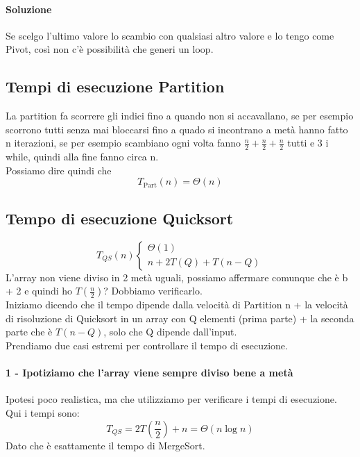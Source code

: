 \paragraph*{Soluzione} Se scelgo l'ultimo valore lo scambio con qualsiasi altro valore e lo tengo come Pivot, 
così non c'è possibilità che generi un loop.
\subsection{Tempi di esecuzione Partition}
La partition fa scorrere gli indici fino a quando non si accavallano, se per
esempio scorrono tutti senza mai bloccarsi fino a quado si incontrano a metà hanno fatto n iterazioni, se
per esempio scambiano ogni volta fanno $\frac{n}{2}+\frac{n}{2}+\frac{n}{2}$ tutti e 3 i while, quindi
alla fine fanno circa n.\\
Possiamo dire quindi che
\begin{equation*}
    T_{\text{Part}}(n)=\Theta(n)
\end{equation*}
\subsection{Tempo di esecuzione Quicksort}
\begin{equation*}
    T_{QS}(n)
    \begin{cases}
        \Theta(1)\\
        n+2T(Q)+T(n-Q)
    \end{cases}
\end{equation*}
L'array non viene diviso in 2 metà uguali, possiamo affermare comunque che è b + 2 e quindi ho
$T(\frac{n}{2})$? Dobbiamo verificarlo.\\
Iniziamo dicendo che il tempo dipende dalla velocità di Partition n + la velocità di risoluzione di Quicksort in un array
con Q elementi (prima parte) + la seconda parte che è $T(n-Q)$, solo che Q dipende dall'input.\\
Prendiamo due casi estremi per controllare il tempo di esecuzione.
\paragraph*{1 - Ipotiziamo che l'array viene sempre diviso bene a metà} Ipotesi poco realistica, ma che utilizziamo per
verificare i tempi di esecuzione.\\
Qui i tempi sono:
\begin{equation*}
    T_{QS}=2T(\frac{n}{2})+n = \Theta(n \log n)
\end{equation*}
Dato che è esattamente il tempo di MergeSort.
